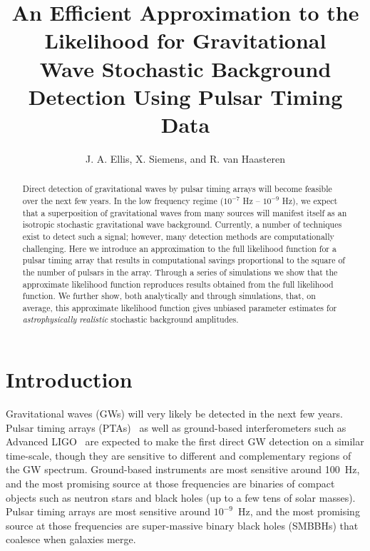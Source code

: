 \documentclass[iop]{emulateapj}
\begin{document}

\title{An Efficient Approximation to the Likelihood for Gravitational\\ Wave Stochastic Background Detection Using Pulsar Timing Data}

\author{J. A. Ellis, X. Siemens, and R. van Haasteren}



\begin{abstract}
Direct detection of gravitational waves by pulsar timing arrays will become feasible over the next few years. In the low frequency regime ($10^{-7}$ Hz -- $10^{-9}$ Hz), we expect that a superposition of gravitational waves from many sources will manifest itself as an isotropic stochastic gravitational wave background. Currently, a number of techniques exist to detect such a signal; however, many detection methods are computationally challenging. Here we introduce an approximation to the full likelihood function for a pulsar timing array that results in computational savings proportional to the square of the number of pulsars in the array. Through a series of simulations we show that the approximate likelihood function reproduces results obtained from the full likelihood function. We further show, both analytically and through simulations, that, on average, this approximate likelihood function gives unbiased parameter estimates for \emph{astrophysically} \emph{realistic} stochastic background amplitudes.
\end{abstract}

\maketitle

\section{Introduction}

Gravitational waves (GWs) will very likely be detected in the next few years. Pulsar timing arrays (PTAs)~\citep{haa+10} as well as ground-based interferometers such as Advanced LIGO~\citep{Waldman:2011vg}  are expected to make the first direct GW detection on a similar time-scale, though they are sensitive to different and complementary regions of the GW spectrum. Ground-based instruments are most sensitive around 100~Hz, and the most promising source at those frequencies are binaries of compact objects such as neutron stars and black holes (up to a few tens of solar masses). Pulsar timing arrays are most sensitive around $10^{-9}$~Hz, and the most promising source at those frequencies are super-massive binary black holes (SMBBHs) that coalesce when galaxies merge.
\end{document}
